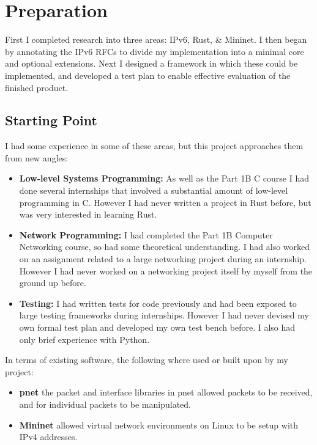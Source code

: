 \documentclass[12pt,a4paper,twoside,openany]{report}
\begin{document}
\chapter{Preparation}
\label{chap::preparation}

First I completed research into three areas: IPv6, Rust, \& Mininet. I then began by annotating the IPv6 RFCs\cite{ipv6_rfc}\cite{ipv6_rfc_adr}\cite{icmpv6_rfc} to divide my implementation into a minimal core and optional extensions. Next I designed a framework in which these could be implemented, and developed a test plan to enable effective evaluation of the finished product.

\section{Starting Point}
I had some experience in some of these areas, but this project approaches them from new angles:
\begin{itemize}
\item \textbf{Low-level Systems Programming:} As well as the Part 1B C course I had done several internships that involved a substantial amount of low-level programming in C. However I had never written a project in Rust before, but was very interested in learning Rust.
\item \textbf{Network Programming:} I had completed the Part 1B Computer Networking course, so had some theoretical understanding.  I had also worked on an assignment related to a large networking project during an internship.  However I had never worked on a networking project itself by myself from the ground up before.
\item \textbf{Testing:} I had written tests for code previously and had been exposed to large testing frameworks during internships.  However I had never devised my own formal test plan and developed my own test bench before. I also had only brief experience with Python.
\end{itemize}
In terms of existing software, the following where used or built upon by my project:
\begin{itemize}
\item \textbf{pnet}\cite{pnet_rust} the packet and interface libraries in pnet allowed packets to be received, and for individual packets to be manipulated.
\item \textbf{Mininet}\cite{mininet} allowed virtual network environments on Linux to be setup with IPv4 addresses.
\end{itemize}
\end{document}
